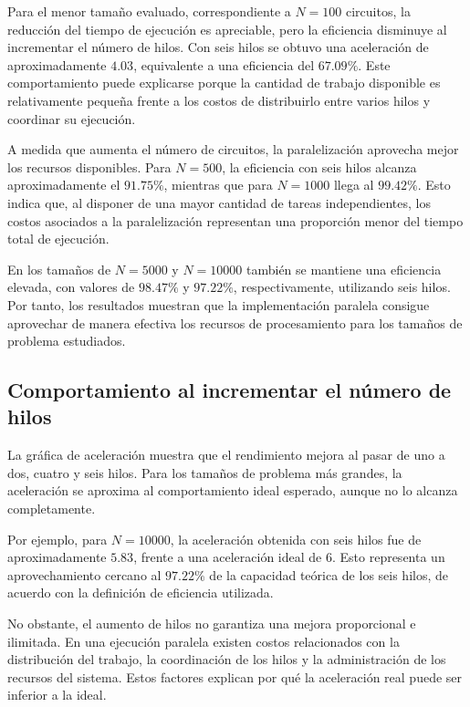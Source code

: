 \documentclass[11pt,a4paper]{article}
\begin{document}
Para el menor tamaño evaluado, correspondiente a $N=100$ circuitos, la reducción del tiempo de ejecución es apreciable, pero la eficiencia disminuye al incrementar el número de hilos. Con seis hilos se obtuvo una aceleración de aproximadamente $4.03$, equivalente a una eficiencia del $67.09\%$. Este comportamiento puede explicarse porque la cantidad de trabajo disponible es relativamente pequeña frente a los costos de distribuirlo entre varios hilos y coordinar su ejecución.

A medida que aumenta el número de circuitos, la paralelización aprovecha mejor los recursos disponibles. Para $N=500$, la eficiencia con seis hilos alcanza aproximadamente el $91.75\%$, mientras que para $N=1000$ llega al $99.42\%$. Esto indica que, al disponer de una mayor cantidad de tareas independientes, los costos asociados a la paralelización representan una proporción menor del tiempo total de ejecución.

En los tamaños de $N=5000$ y $N=10000$ también se mantiene una eficiencia elevada, con valores de $98.47\%$ y $97.22\%$, respectivamente, utilizando seis hilos. Por tanto, los resultados muestran que la implementación paralela consigue aprovechar de manera efectiva los recursos de procesamiento para los tamaños de problema estudiados.

\subsection{Comportamiento al incrementar el número de hilos}

La gráfica de aceleración muestra que el rendimiento mejora al pasar de uno a dos, cuatro y seis hilos. Para los tamaños de problema más grandes, la aceleración se aproxima al comportamiento ideal esperado, aunque no lo alcanza completamente.

Por ejemplo, para $N=10000$, la aceleración obtenida con seis hilos fue de aproximadamente $5.83$, frente a una aceleración ideal de $6$. Esto representa un aprovechamiento cercano al $97.22\%$ de la capacidad teórica de los seis hilos, de acuerdo con la definición de eficiencia utilizada.

No obstante, el aumento de hilos no garantiza una mejora proporcional e ilimitada. En una ejecución paralela existen costos relacionados con la distribución del trabajo, la coordinación de los hilos y la administración de los recursos del sistema. Estos factores explican por qué la aceleración real puede ser inferior a la ideal.
\end{document}
